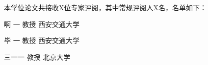 
\fancyfoot[LE,RO]{}

{}

本学位论文共接收X位专家评阅，其中常规评阅人X名，名单如下：

\quad 啊 一 \quad\quad\quad\quad\quad\quad\quad\quad 教授 \quad\quad\quad\quad\quad\quad\quad\quad  西安交通大学

\quad 毕 一 \quad\quad\quad\quad\quad\quad\quad\quad 教授 \quad\quad\quad\quad\quad\quad\quad\quad  西安交通大学

\quad 三一一 \quad\quad\quad\quad\quad\quad\quad 教授 \quad\quad\quad\quad\quad\quad\quad\quad\quad  北京大学

